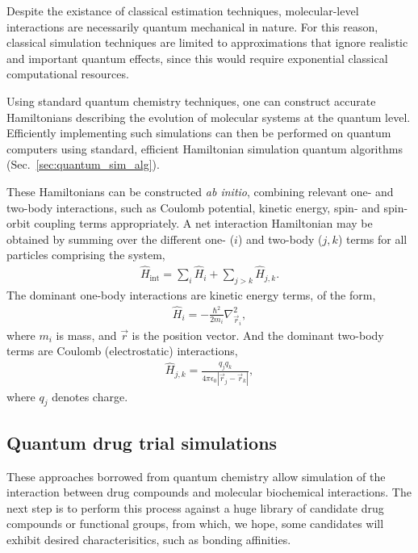 Despite the existance of classical estimation techniques, molecular-level interactions are necessarily quantum mechanical in nature. For this reason, classical simulation techniques are limited to approximations that ignore realistic and important quantum effects, since this would require exponential classical computational resources.

Using standard quantum chemistry techniques, one can construct accurate Hamiltonians describing the evolution of molecular systems at the quantum level. Efficiently implementing such simulations can then be performed on quantum computers using standard, efficient Hamiltonian simulation quantum algorithms (Sec.~\ref{sec:quantum_sim_alg}).

These Hamiltonians can be constructed \textit{ab initio}, combining relevant one- and two-body interactions, such as Coulomb potential, kinetic energy, spin- and spin-orbit coupling terms appropriately. A net interaction Hamiltonian may be obtained by summing over the different one- ($i$) and two-body (\mbox{$j,k$}) terms for all particles comprising the system,
\begin{align}
	\hat{H}_\mathrm{int} = \sum_i \hat{H}_i + \sum_{j>k} \hat{H}_{j,k}.
\end{align}
The dominant one-body interactions are kinetic energy terms, of the form,
\begin{align}
\hat{H}_i = -\frac{\hbar^2}{2m_i}\nabla^2_{\vec{r}_i},
\end{align}
where $m_i$ is mass, and $\vec{r}$ is the position vector. And the dominant two-body terms are Coulomb (electrostatic) interactions,
\begin{align}
\hat{H}_{j,k} = \frac{q_j q_k}{4\pi\epsilon_0|\vec{r}_j-\vec{r}_k|},
\end{align}
where $q_j$ denotes charge.

%
%

\subsection{Quantum drug trial simulations}

These approaches borrowed from quantum chemistry allow simulation of the interaction between drug compounds and molecular biochemical interactions. The next step is to perform this process against a huge library of candidate drug compounds or functional groups, from which, we hope, some candidates will exhibit desired characterisitics, such as bonding affinities.

